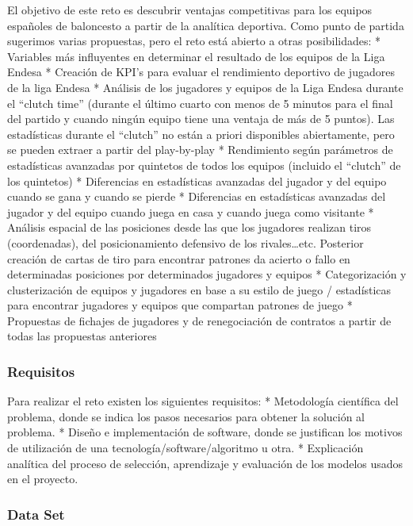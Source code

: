 \documentclass[]{article}
\begin{document}
El objetivo de este reto es descubrir ventajas competitivas para los
equipos españoles de baloncesto a partir de la analítica deportiva. Como
punto de partida sugerimos varias propuestas, pero el reto está abierto
a otras posibilidades: * Variables más influyentes en determinar el
resultado de los equipos de la Liga Endesa * Creación de KPI's para
evaluar el rendimiento deportivo de jugadores de la liga Endesa *
Análisis de los jugadores y equipos de la Liga Endesa durante el
``clutch time'' (durante el último cuarto con menos de 5 minutos para el
final del partido y cuando ningún equipo tiene una ventaja de más de 5
puntos). Las estadísticas durante el ``clutch'' no están a priori
disponibles abiertamente, pero se pueden extraer a partir del
play-by-play * Rendimiento según parámetros de estadísticas avanzadas
por quintetos de todos los equipos (incluido el ``clutch'' de los
quintetos) * Diferencias en estadísticas avanzadas del jugador y del
equipo cuando se gana y cuando se pierde * Diferencias en estadísticas
avanzadas del jugador y del equipo cuando juega en casa y cuando juega
como visitante * Análisis espacial de las posiciones desde las que los
jugadores realizan tiros (coordenadas), del posicionamiento defensivo de
los rivales\ldots{}etc. Posterior creación de cartas de tiro para
encontrar patrones da acierto o fallo en determinadas posiciones por
determinados jugadores y equipos * Categorización y clusterización de
equipos y jugadores en base a su estilo de juego / estadísticas para
encontrar jugadores y equipos que compartan patrones de juego *
Propuestas de fichajes de jugadores y de renegociación de contratos a
partir de todas las propuestas anteriores

\subsubsection{Requisitos}\label{requisitos}

Para realizar el reto existen los siguientes requisitos: * Metodología
científica del problema, donde se indica los pasos necesarios para
obtener la solución al problema. * Diseño e implementación de software,
donde se justifican los motivos de utilización de una
tecnología/software/algoritmo u otra. * Explicación analítica del
proceso de selección, aprendizaje y evaluación de los modelos usados en
el proyecto.

\subsubsection{Data Set}\label{data-set}
\end{document}
